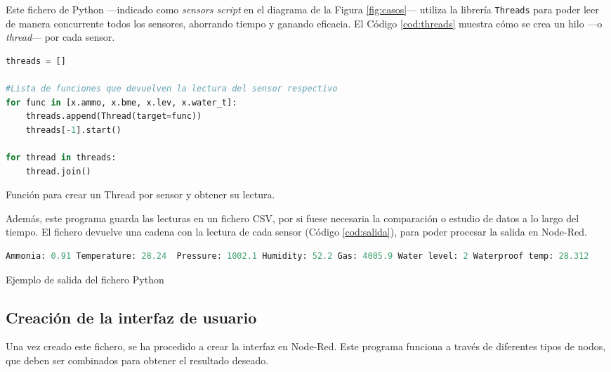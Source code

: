 Este fichero de Python ---indicado como \textit{sensors script} en el diagrama de la Figura \ref{fig:casos}--- utiliza la librería \verb|Threads| para poder leer de manera concurrente todos los sensores, ahorrando tiempo y ganando eficacia. El Código \ref{cod:threads} muestra cómo se crea un hilo ---o \textit{thread}--- por cada sensor.\\
\begin{code}[h]
\begin{lstlisting}[language=Python]
threads = []

#Lista de funciones que devuelven la lectura del sensor respectivo
for func in [x.ammo, x.bme, x.lev, x.water_t]: 
	threads.append(Thread(target=func))
	threads[-1].start()
	
for thread in threads:
	thread.join()
\end{lstlisting}
\caption[Función para crear un Thread por sensor y obtener su lectura.]{Función para crear un Thread por sensor y obtener su lectura.}
\label{cod:threads}
\end{code}

Además, este programa guarda las lecturas en un fichero CSV, por si fuese necesaria la comparación o estudio de datos a lo largo del tiempo. El fichero devuelve una cadena con la lectura de cada sensor (Código \ref{cod:salida}), para poder procesar la salida en Node-Red.\\
\begin{code}[h]
\begin{lstlisting}[language=Python]
Ammonia: 0.91 Temperature: 28.24  Pressure: 1002.1 Humidity: 52.2 Gas: 4005.9 Water level: 2 Waterproof temp: 28.312
\end{lstlisting}
\caption[Ejemplo de salida del fichero Python]{Ejemplo de salida del fichero Python}
\label{cod:salida}
\end{code}

\subsection{Creación de la interfaz de usuario}
\label{sec:IU}
Una vez creado este fichero, se ha procedido a crear la interfaz en Node-Red. Este programa funciona a través de diferentes tipos de nodos, que deben ser combinados para obtener el resultado deseado.\\

